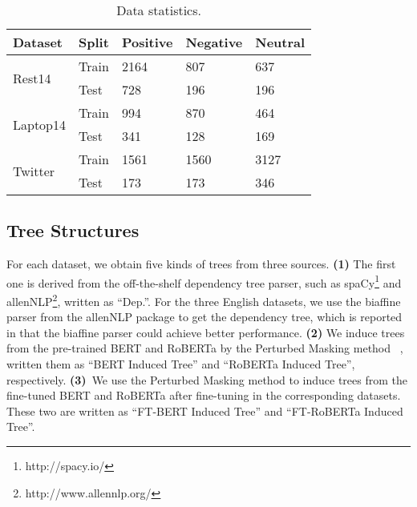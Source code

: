 \documentclass[11pt]{article}
\begin{document}
\begin{table}[]
  \centering\small
  \setlength\tabcolsep{1pt}
  \begin{tabular}{m{2.1cm}m{1.1cm}<{\centering}m{1.4cm}<{\centering}m{1.5cm}<{\centering}m{1.4cm}<{\centering}}
    \toprule
    \textbf{Dataset}          & \textbf{Split} & \textbf{Positive} & \textbf{Negative} & \textbf{Neutral} \\\midrule
    \multirow{2}{*}{Rest14}   & Train          & 2164              & 807               & 637              \\
                              & Test           & 728               & 196               & 196              \\ \midrule
    \multirow{2}{*}{Laptop14} & Train          & 994               & 870               & 464              \\
                              & Test           & 341               & 128               & 169              \\\midrule
    \multirow{2}{*}{Twitter}  & Train          & 1561              & 1560              & 3127             \\
                              & Test           & 173               & 173               & 346              \\
\bottomrule
  \end{tabular}\caption{Data statistics.}
  \label{tb:data}
\end{table}


\subsection{Tree Structures} \label{sec:tree_structure}
For each dataset, we obtain five kinds of trees from three sources. \textbf{(1)} The first one is derived from the off-the-shelf dependency tree parser, such as spaCy\footnote{http://spacy.io/} and allenNLP\footnote{http://www.allennlp.org/}, written as ``Dep.''. For the three English datasets, we use the biaffine parser from the allenNLP package to get the dependency tree, which is reported in \citet{DBLP:conf/acl/WangSYQW20}  that the biaffine parser could achieve better performance.
\textbf{(2)} We induce trees from the pre-trained BERT and RoBERTa by the Perturbed Masking method ~\citep{DBLP:conf/acl/WuCKL20}, written them as ``BERT Induced Tree'' and ``RoBERTa Induced Tree'', respectively.
\textbf{(3)}~We use the  Perturbed Masking method to induce trees from the fine-tuned BERT and RoBERTa after fine-tuning in the corresponding datasets.
These two are written as ``FT-BERT Induced Tree'' and ``FT-RoBERTa Induced Tree''.
\end{document}
